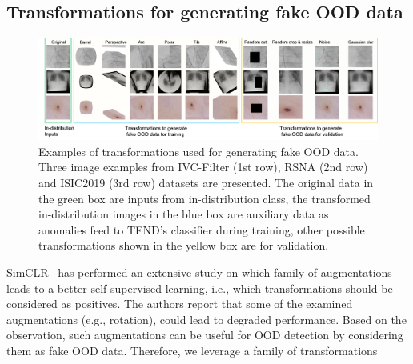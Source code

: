 \documentclass[12pt]{spieman}  %
\begin{document}
\begin{spacing}{2}
\subsection{Transformations for generating fake OOD data}\label{Transformations}
\begin{figure}
\begin{center}
    \includegraphics[width=\linewidth]{fig2.png}
\end{center}
  \caption{Examples of transformations used for generating fake OOD data. Three image examples from IVC-Filter (1st row), RSNA (2nd row) and ISIC2019 (3rd row) datasets are presented. The original data in the green box are inputs from in-distribution class, the transformed in-distribution images in the blue box are auxiliary data as anomalies feed to TEND's classifier during training, other possible transformations shown in the yellow box are for validation. } 
\label{fig:example}
\end{figure}
SimCLR~\cite{chen2020simple} has performed an extensive study on which family of augmentations leads to a better self-supervised learning, i.e., which transformations should be considered as positives. The authors report that some of the examined augmentations (e.g., rotation), could lead to degraded performance. Based on the observation, such augmentations can be useful for OOD detection by considering them as fake OOD data. Therefore, we leverage a family of transformations

\end{spacing}
\end{document}
